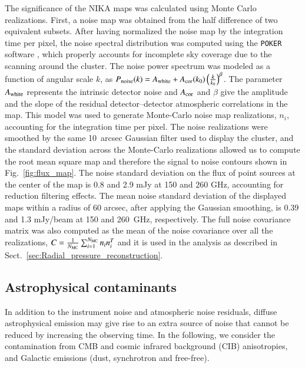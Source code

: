 \documentclass[twocolumn,traditabstract]{aa}
\begin{document}
The significance of the NIKA maps was calculated using Monte Carlo realizations. First, a noise map was obtained from the half difference of two equivalent subsets. After having normalized the noise map by the integration time per pixel, the noise spectral distribution was computed using the {\tt POKER} software \citep{ponthieu2011}, which properly accounts for incomplete sky coverage due to the scanning around the cluster. The noise power spectrum was modeled as a function of angular scale $k$, as $P_{\rm noise}(k) = A_{\rm white} + A_{\rm cor}(k_0) \left(\frac{k}{k_0}\right)^{\beta}$. The parameter $A_{\rm white}$ represents the intrinsic detector noise and $A_{\rm cor}$ and $\beta$ give the amplitude and the slope of the residual detector--detector atmospheric correlations in the map. This model was used to generate Monte-Carlo noise map realizations, $n_i$, accounting for the integration time per pixel. The noise realizations were smoothed by the same 10~arcsec Gaussian filter used to display the cluster, and the standard deviation across the Monte-Carlo realizations allowed us to compute the root mean square map and therefore the signal to noise contours shown in Fig.~\ref{fig:flux_map}. The noise standard deviation on the flux of point sources at the center of the map is 0.8 and 2.9 mJy at 150 and 260 GHz, accounting for reduction filtering effects. The mean noise standard deviation of the displayed maps within a radius of 60 arcsec, after applying the Gaussian smoothing, is 0.39 and 1.3 mJy/beam at 150 and 260~GHz, respectively. The full noise covariance matrix was also computed as the mean of the noise covariance over all the realizations, $C = \frac{1}{N_{\rm MC}}\sum_{i=1}^{N_{\rm MC}}n_i n_i^{T}$ and it is used in the analysis as described in Sect.~\ref{sec:Radial_pressure_reconstruction}.

\subsection{Astrophysical contaminants}\label{sec:astrophysical_contaminant}
In addition to the instrument noise and atmospheric noise residuals, diffuse astrophysical emission may give rise to an extra source of noise that cannot be reduced by increasing the observing time. In the following, we consider the contamination from CMB and cosmic infrared background (CIB) anisotropies, and Galactic emissions (dust, synchrotron and free-free). 
\end{document}
